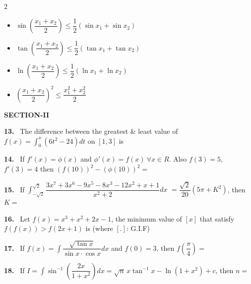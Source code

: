 \documentclass[10pt]{extarticle}
\newcommand{\sect}[1]{\par\smallskip\noindent\textbf{#1}\par}
\newcommand{\qn}[1]{\par\smallskip\noindent\textbf{#1.}~}
\newenvironment{qoptions}{\begin{itemize}[leftmargin=1.8em,itemsep=1pt,topsep=2pt,label={}]}{\end{itemize}}
\newcommand{\opt}[2]{\item[(#1)] #2}
\begin{document}
\begin{multicols}{2}
\begin{qoptions}
\opt{A}{$\sin\left(\dfrac{x_1+x_2}2\right)\le\dfrac12\left(\sin x_1+\sin x_2\right)$}
\opt{B}{$\tan\left(\dfrac{x_1+x_2}2\right)\le\dfrac12\left(\tan x_1+\tan x_2\right)$}
\opt{C}{$\ln\left(\dfrac{x_1+x_2}2\right)\le\dfrac12\left(\ln x_1+\ln x_2\right)$}
\opt{D}{$\left(\dfrac{x_1+x_2}2\right)^2\le\dfrac{x_1^2+x_2^2}2$}
\end{qoptions}
\sect{SECTION-II}
\qn{13} The difference between the greatest \& least value of $f(x)=\displaystyle\int_0^x\left(6t^2-24\right)dt$ on $[1,3]$ is \underline{\hspace{1.5cm}}
\qn{14} If $f'(x)=\phi(x)$ and $\phi'(x)=f(x)\ \forall x\in R$. Also $f(3)=5$, $f'(3)=4$ then $\left(f(10)\right)^2-\left(\phi(10)\right)^2=$ \underline{\hspace{1.5cm}}
\qn{15} If $\displaystyle\int_{-\sqrt2}^{\sqrt2}\dfrac{3x^7+3x^6-9x^5-8x^3-12x^2+x+1}{x^2+2}dx$ $=\dfrac{\sqrt2}{20}\left(5\pi+K^2\right)$, then $K=$ \underline{\hspace{1.5cm}}
\qn{16} Let $f(x)=x^3+x^2+2x-1$, the minimum value of $[x]$ that satisfy $f\left(f(x)\right)>f(2x+1)$ is (where $[.]$: G.I.F) \underline{\hspace{1.5cm}}
\qn{17} If $f(x)=\displaystyle\int\dfrac{\sqrt{\tan x}}{\sin x\cdot\cos x}dx$ and $f(0)=3$, then $f\left(\dfrac\pi4\right)=$ \underline{\hspace{1.5cm}}
\qn{18} If $I=\displaystyle\int\sin^{-1}\left(\dfrac{2x}{1+x^2}\right)dx=\sqrt n\,x\tan^{-1}x-\ln\left(1+x^2\right)+c$, then $n=$ \underline{\hspace{1.5cm}}
\end{multicols}
\end{document}
